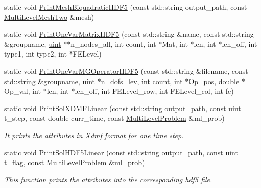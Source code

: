 \begin{DoxyCompactItemize}
static void \mbox{\hyperlink{classfemus_1_1_x_d_m_f_writer_ad7cfe98062b672cc38959173c4b31b3a}{Print\+Mesh\+Biquadratic\+H\+D\+F5}} (const std\+::string output\+\_\+path, const \mbox{\hyperlink{classfemus_1_1_multi_level_mesh_two}{Multi\+Level\+Mesh\+Two}} \&mesh)
\item 
static void \mbox{\hyperlink{classfemus_1_1_x_d_m_f_writer_aa58487f12b6c52bb458430f3cabdab3f}{Print\+One\+Var\+Matrix\+H\+D\+F5}} (const std\+::string \&name, const std\+::string \&groupname, \mbox{\hyperlink{_typedefs_8hpp_a91ad9478d81a7aaf2593e8d9c3d06a14}{uint}} $\ast$$\ast$n\+\_\+nodes\+\_\+all, int count, int $\ast$Mat, int $\ast$len, int $\ast$len\+\_\+off, int type1, int type2, int $\ast$F\+E\+Level)
\item 
static void \mbox{\hyperlink{classfemus_1_1_x_d_m_f_writer_ac38de668fd2f8baa0e1930e90354f1e9}{Print\+One\+Var\+M\+G\+Operator\+H\+D\+F5}} (const std\+::string \&filename, const std\+::string \&groupname, \mbox{\hyperlink{_typedefs_8hpp_a91ad9478d81a7aaf2593e8d9c3d06a14}{uint}} $\ast$n\+\_\+dofs\+\_\+lev, int count, int $\ast$Op\+\_\+pos, double $\ast$Op\+\_\+val, int $\ast$len, int $\ast$len\+\_\+off, int F\+E\+Level\+\_\+row, int F\+E\+Level\+\_\+col, int fe)
\item 
static void \mbox{\hyperlink{classfemus_1_1_x_d_m_f_writer_a769cbc2ebb69a79fd2a1dee182f90fba}{Print\+Sol\+X\+D\+M\+F\+Linear}} (const std\+::string output\+\_\+path, const \mbox{\hyperlink{_typedefs_8hpp_a91ad9478d81a7aaf2593e8d9c3d06a14}{uint}} t\+\_\+step, const double curr\+\_\+time, const \mbox{\hyperlink{classfemus_1_1_multi_level_problem}{Multi\+Level\+Problem}} \&ml\+\_\+prob)
\begin{DoxyCompactList}\small\item\em It prints the attributes in Xdmf format for one time step. \end{DoxyCompactList}\item 
static void \mbox{\hyperlink{classfemus_1_1_x_d_m_f_writer_a103337e419e4351e2a830f89e55c67f5}{Print\+Sol\+H\+D\+F5\+Linear}} (const std\+::string output\+\_\+path, const \mbox{\hyperlink{_typedefs_8hpp_a91ad9478d81a7aaf2593e8d9c3d06a14}{uint}} t\+\_\+flag, const \mbox{\hyperlink{classfemus_1_1_multi_level_problem}{Multi\+Level\+Problem}} \&ml\+\_\+prob)
\begin{DoxyCompactList}\small\item\em This function prints the attributes into the corresponding hdf5 file. \end{DoxyCompactList}\item 
$$
\end{DoxyCompactItemize}
